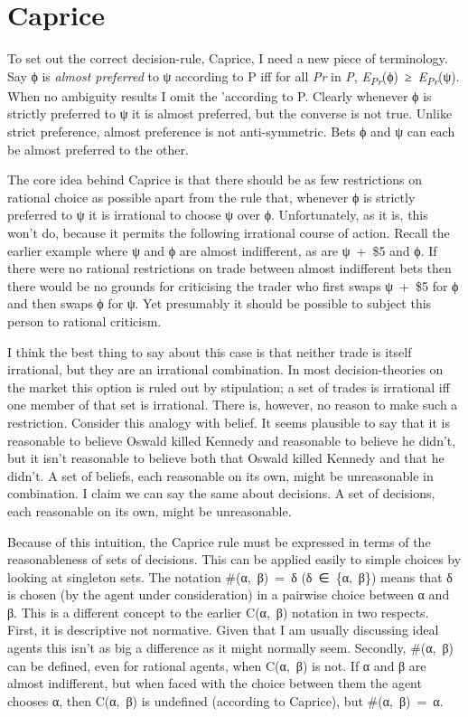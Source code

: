 \documentclass[
  10pt,
  letterpaper,
  DIV=11,
  numbers=noendperiod,
  twoside]{scrartcl}
\begin{document}
\section{Caprice}\label{caprice}

To set out the correct decision-rule, Caprice, I need a new piece of
terminology. Say ϕ is \emph{almost preferred} to ψ according to P iff
for all \emph{Pr} in \emph{P},
\emph{E\textsubscript{Pr}}(ϕ)~≥~\emph{E\textsubscript{Pr}}(ψ). When no
ambiguity results I omit the 'according to P. Clearly whenever ϕ is
strictly preferred to ψ it is almost preferred, but the converse is not
true. Unlike strict preference, almost preference is not anti-symmetric.
Bets ϕ and ψ can each be almost preferred to the other.

The core idea behind Caprice is that there should be as few restrictions
on rational choice as possible apart from the rule that, whenever ϕ is
strictly preferred to ψ it is irrational to choose ψ over ϕ.
Unfortunately, as it is, this won't do, because it permits the following
irrational course of action. Recall the earlier example where ψ and ϕ
are almost indifferent, as are ψ~+~\$5 and ϕ. If there were no rational
restrictions on trade between almost indifferent bets then there would
be no grounds for criticising the trader who first swaps ψ~+~\$5 for ϕ
and then swaps ϕ for ψ. Yet presumably it should be possible to subject
this person to rational criticism.

I think the best thing to say about this case is that neither trade is
itself irrational, but they are an irrational combination. In most
decision-theories on the market this option is ruled out by stipulation;
a set of trades is irrational iff one member of that set is irrational.
There is, however, no reason to make such a restriction. Consider this
analogy with belief. It seems plausible to say that it is reasonable to
believe Oswald killed Kennedy and reasonable to believe he didn't, but
it isn't reasonable to believe both that Oswald killed Kennedy and that
he didn't. A set of beliefs, each reasonable on its own, might be
unreasonable in combination. I claim we can say the same about
decisions. A set of decisions, each reasonable on its own, might be
unreasonable.

Because of this intuition, the Caprice rule must be expressed in terms
of the reasonableness of sets of decisions. This can be applied easily
to simple choices by looking at singleton sets. The notation
\#(α,~β)~=~δ (δ~∈~\{α,~β\}) means that δ is chosen (by the agent under
consideration) in a pairwise choice between α and β. This is a different
concept to the earlier C(α,~β) notation in two respects. First, it is
descriptive not normative. Given that I am usually discussing ideal
agents this isn't as big a difference as it might normally seem.
Secondly, \#(α,~β) can be defined, even for rational agents, when
C(α,~β) is not. If α and β are almost indifferent, but when faced with
the choice between them the agent chooses α, then C(α,~β) is undefined
(according to Caprice), but \#(α,~β)~=~α.
\end{document}
